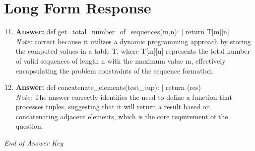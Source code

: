 \documentclass[12pt]{article}
\begin{document}
\section*{Long Form Response}
\begin{enumerate}[label=\arabic*.]
\setcounter{enumi}{10}
\item \textbf{Answer:} def get\_total\_number\_of\_sequences(m,n): | return T[m][n]
\\ \textit{Note:} correct because it utilizes a dynamic programming approach by storing the computed values in a table T, where T[m][n] represents the total number of valid sequences of length n with the maximum value m, effectively encapsulating the problem constraints of the sequence formation.
\item \textbf{Answer:} def concatenate\_elements(test\_tup): | return (res)
\\ \textit{Note:} The answer correctly identifies the need to define a function that processes tuples, suggesting that it will return a result based on concatenating adjacent elements, which is the core requirement of the question.
\end{enumerate}

\vfill
\noindent\textit{End of Answer Key}
\end{document}
